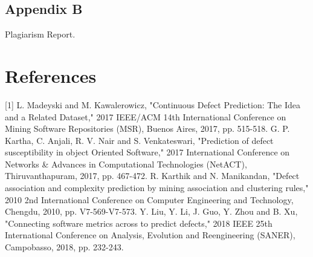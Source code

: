 \documentclass[oneside,a4paper,12pt]{book}
\begin{document}
\newpage
\section{Appendix B}
Plagiarism Report.

\newpage
\chapter{References}

[1] L. Madeyski and M. Kawalerowicz, "Continuous Defect Prediction: The Idea and a Related Dataset," 2017 IEEE/ACM 14th International Conference on Mining Software Repositories (MSR), Buenos Aires, 2017, pp. 515-518. \newline
[2] G. P. Kartha, C. Anjali, R. V. Nair and S. Venkateswari, "Prediction of defect susceptibility in object Oriented Software," 2017 International Conference on Networks & Advances in Computational Technologies (NetACT), Thiruvanthapuram, 2017, pp. 467-472. \newline
[3] R. Karthik and N. Manikandan, "Defect association and complexity prediction by mining association and clustering rules," 2010 2nd International Conference on Computer Engineering and Technology, Chengdu, 2010, pp. V7-569-V7-573. \newline
[4] Y. Liu, Y. Li, J. Guo, Y. Zhou and B. Xu, "Connecting software metrics across to predict defects," 2018 IEEE 25th International Conference on Analysis, Evolution and Reengineering (SANER), Campobasso, 2018, pp. 232-243. \newline
\newline
\end{document}
